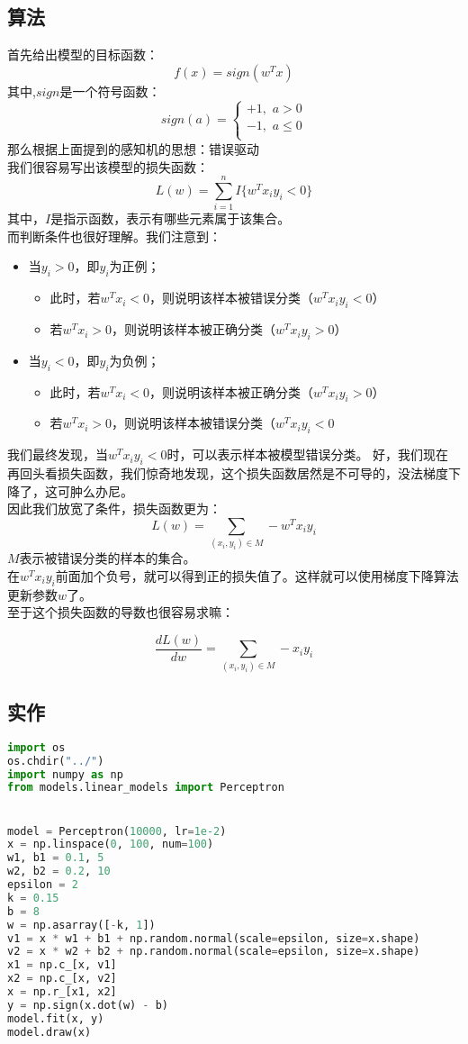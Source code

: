 \documentclass{report}
\begin{document}
\subsection{算法}
首先给出模型的目标函数：
$$
f(x)=sign(w^Tx)
$$
其中,$sign$是一个符号函数：
$$
sign(a)=
\begin{cases}
+1,\,\,a>0\\
-1,\,\,a\le0\\
\end{cases}
$$
那么根据上面提到的感知机的思想：错误驱动\\
我们很容易写出该模型的损失函数：
$$
L(w)=\sum_{i=1}^n I\{w^Tx_i  y_i<0 \}
$$
其中，$I$是指示函数，表示有哪些元素属于该集合。\\
而判断条件也很好理解。我们注意到：
\begin{itemize}
	\item 当$y_i>0$，即$y_i$为正例；
	\begin{itemize}
	\item 此时，若$w^Tx_i<0$，则说明该样本被错误分类（$w^Tx_i y_i<0$）
	\item 若$w^Tx_i>0$，则说明该样本被正确分类（$w^Tx_i y_i>0$）
	\end{itemize}
	\item 当$y_i<0$，即$y_i$为负例；
	\begin{itemize}
	\item 此时，若$w^Tx_i<0$，则说明该样本被正确分类（$w^Tx_i y_i>0$）
	\item 若$w^Tx_i>0$，则说明该样本被错误分类（$w^Tx_i y_i<0$
	\end{itemize}
\end{itemize}
我们最终发现，当$w^Tx_i  y_i<0$时，可以表示样本被模型错误分类。
好，我们现在再回头看损失函数，我们惊奇地发现，这个损失函数居然是不可导的，没法梯度下降了，这可肿么办尼。\\
因此我们放宽了条件，损失函数更为：
$$
L(w)=\sum_{(x_i,y_i)\in M} -w^Tx_i y_i
$$
$M$表示被错误分类的样本的集合。\\
在$w^Tx_i y_i$前面加个负号，就可以得到正的损失值了。这样就可以使用梯度下降算法更新参数$w$了。\\
至于这个损失函数的导数也很容易求嘛：

$$
\frac{dL(w)}{dw}=\sum_{(x_i,y_i)\in M} -x_i y_i
$$
\subsection{实作}
\begin{lstlisting}[language={python}]
import os
os.chdir("../")
import numpy as np
from models.linear_models import Perceptron


model = Perceptron(10000, lr=1e-2)
x = np.linspace(0, 100, num=100)
w1, b1 = 0.1, 5
w2, b2 = 0.2, 10
epsilon = 2
k = 0.15
b = 8
w = np.asarray([-k, 1])
v1 = x * w1 + b1 + np.random.normal(scale=epsilon, size=x.shape)
v2 = x * w2 + b2 + np.random.normal(scale=epsilon, size=x.shape)
x1 = np.c_[x, v1]
x2 = np.c_[x, v2]
x = np.r_[x1, x2]
y = np.sign(x.dot(w) - b)
model.fit(x, y)
model.draw(x)
\end{lstlisting}
\end{document}
